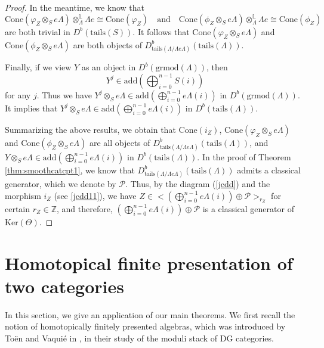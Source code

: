 \documentclass[11pt,reqno]{amsart}
\theoremstyle{definition}
\begin{document}
\begin{proof}
In the meantime, we know that
$$
\mathrm{Cone}(\varphi_{Z} \otimes_{S} e\Lambda ) 
\otimes^{\mathbb{L}}_{\Lambda} \Lambda e \cong \mathrm{Cone}(\varphi_{Z}) 
\quad\mbox{and}\quad
\mathrm{Cone}(\phi_{Z} \otimes_{S} e\Lambda )
 \otimes^{\mathbb{L}}_{\Lambda} \Lambda e \cong \mathrm{Cone}(\phi_{Z})
 $$
are both trivial in $D^{b}(\mathrm{tails}(S))$. It follows that 
$\mathrm{Cone}(\varphi_{Z} \otimes_{S} e\Lambda )$ and 
$\mathrm{Cone}(\phi_{Z} \otimes_{S} e\Lambda )$
are both objects of $D_{\mathrm{tails}(\Lambda / \Lambda e \Lambda )}^{b}(\mathrm{tails}(\Lambda))$.

Finally, if we view $Y$ as an object in $D^{b}(\mathrm{grmod}(\Lambda))$,
then
$$
Y^j \in \mathrm{add}(\bigoplus^{n-1}_{i =0} S(i) )
$$
for any $j$. Thus we have
$Y^j \otimes_{S} e \Lambda \in \mathrm{add}(\bigoplus\limits^{n-1}_{i = 0} e \Lambda(i) 
)$ in $D^{b}(\mathrm{grmod}(\Lambda))$. 
It implies that 
$Y^j \otimes_{S} e \Lambda \in \mathrm{add}(\bigoplus\limits^{n-1}_{i = 0} e \Lambda(i) 
)$ in $D^{b}(\mathrm{tails}(\Lambda))$.

Summarizing the above results, we obtain that $\mathrm{Cone}(i_{Z})$,
$\mathrm{Cone}(\varphi_{Z} \otimes_{S} e\Lambda )$ and 
$\mathrm{Cone}(\phi_{Z} \otimes_{S} e\Lambda )$
are all objects of $D_{\mathrm{tails}(\Lambda / \Lambda e \Lambda )}^{b}
(\mathrm{tails}(\Lambda))$, and
$Y \otimes_{S} e \Lambda \in \mathrm{add}(\bigoplus\limits^{n-1}_{i = 0} 
e \Lambda(i) )$ 
in $D^{b}(\mathrm{tails}(\Lambda))$.
In the proof of Theorem \ref{thm:smoothcatcpt1}, we know that
$D_{\mathrm{tails}(\Lambda / \Lambda e \Lambda )}^{b}(\mathrm{tails}(\Lambda))$
admits a classical generator, which we denote by $\mathcal{P}$. 
Thus, by the diagram (\ref{jcdd})  and the morphism $i_Z$ (see
\ref{jcdd11}), we
have $Z \in \big< (\bigoplus\limits^{n-1}_{i = 0} e \Lambda(i)) \oplus \mathcal{P} \big>_{r_Z}$
for certain $r_{Z} \in \mathbb{Z}$,
and therefore, $(\bigoplus\limits^{n-1}_{i = 0} e \Lambda(i)) 
\oplus \mathcal{P}$ is a classical generator
of $\mathrm{Ker}(\Theta)$.
\end{proof}





\section{Homotopical finite presentation of two categories}\label{sect:HFP}

In this section, we give an application of our main theorems.
We first recall the notion of homotopically finitely presented algebras,
which
was introduced by To\"en and Vaqui\'e in \cite{TV},
in their study of the moduli stack of DG categories. 
\end{document}
